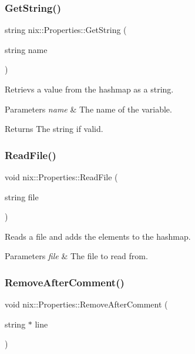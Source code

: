 \subsubsection{\texorpdfstring{Get\+String()}{GetString()}}
{\footnotesize\ttfamily string nix\+::\+Properties\+::\+Get\+String (\begin{DoxyParamCaption}\item[{string}]{name }\end{DoxyParamCaption})}



Retrievs a value from the hashmap as a string. 


\begin{DoxyParams}{Parameters}
{\em name} & The name of the variable. \\
\hline
\end{DoxyParams}
\begin{DoxyReturn}{Returns}
The string if valid. 
\end{DoxyReturn}
\mbox{\label{classnix_1_1Properties_a9e98d0d77432603f545c083738548a4f}} 
\subsubsection{\texorpdfstring{Read\+File()}{ReadFile()}}
{\footnotesize\ttfamily void nix\+::\+Properties\+::\+Read\+File (\begin{DoxyParamCaption}\item[{string}]{file }\end{DoxyParamCaption})}



Reads a file and adds the elements to the hashmap. 


\begin{DoxyParams}{Parameters}
{\em file} & The file to read from. \\
\hline
\end{DoxyParams}
\mbox{\label{classnix_1_1Properties_a17d9056025f9bb3005987bdf5b36f47a}} 
\subsubsection{\texorpdfstring{Remove\+After\+Comment()}{RemoveAfterComment()}}
{\footnotesize\ttfamily void nix\+::\+Properties\+::\+Remove\+After\+Comment (\begin{DoxyParamCaption}\item[{string $\ast$}]{line }\end{DoxyParamCaption})\hspace{0.3cm}{\ttfamily [static]}}



